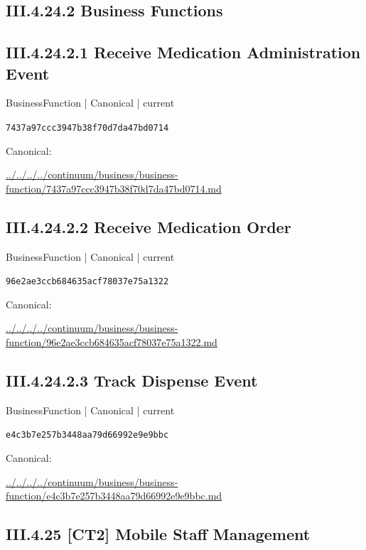 \documentclass[10pt,a4paper]{article}
\begin{document}
\subsection*{III.4.24.2 Business Functions}
\subsection*{III.4.24.2.1 Receive Medication Administration Event}
{\small BusinessFunction | Canonical | current}\par
\texttt{7437a97ccc3947b38f70d7da47bd0714}\par
Canonical: \par
{\footnotesize\url{../../../../continuum/business/business-function/7437a97ccc3947b38f70d7da47bd0714.md}}\par
\subsection*{III.4.24.2.2 Receive Medication Order}
{\small BusinessFunction | Canonical | current}\par
\texttt{96e2ae3ccb684635acf78037e75a1322}\par
Canonical: \par
{\footnotesize\url{../../../../continuum/business/business-function/96e2ae3ccb684635acf78037e75a1322.md}}\par
\subsection*{III.4.24.2.3 Track Dispense Event}
{\small BusinessFunction | Canonical | current}\par
\texttt{e4c3b7e257b3448aa79d66992e9e9bbc}\par
Canonical: \par
{\footnotesize\url{../../../../continuum/business/business-function/e4c3b7e257b3448aa79d66992e9e9bbc.md}}\par
\subsection*{III.4.25 [CT2] Mobile Staff Management}
\end{document}
